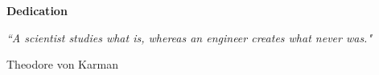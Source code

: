
\newpage
\vspace*{0.9cm}
\begin{center}
{\bf \Huge Dedication}
\end{center}

\setlength{\baselineskip}{0.8cm}



 \null\vfill %

\textit{``A scientist studies what is, whereas an engineer creates what never was."}

\begin{flushright}
Theodore von Karman
\end{flushright}

 \vfill\vfill\vfill\vfill\vfill\vfill\null %
